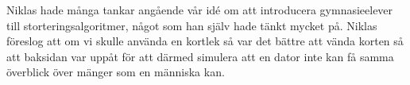 \textcolor{turkos}{Niklas hade många tankar angående vår idé om att introducera gymnasieelever till storteringsalgoritmer, något som han själv hade tänkt mycket på. Niklas föreslog att om vi skulle använda en kortlek så var det bättre att vända korten så att baksidan var uppåt för att därmed simulera att en dator inte kan få samma överblick över mänger som en människa kan.}


